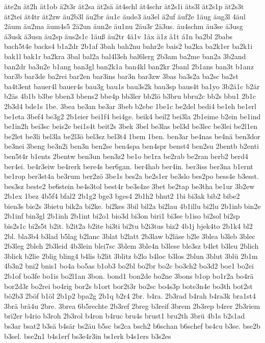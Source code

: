 {äte2n
ät2h
ät1ob
ä2t3r
ät2sa
ät2sä
ät4schl
ät4schr
ät2s1i
äts3l
ät2s1p
ät2s3t
ät2tei
ät4tr
ät2zw
äu2b3l
äu2br
äu1c
äude3
äu3el
ä2uf
äuf2e
1äug
äug3l
4äul
2äum
äu2ma
äum4s5
2ä2un
äun2e
äu1nu
2äu3r
2ä3us.
äu4schm
äu3se
ä3usg
ä3usk
ä3usn
äu2sp
äus2s1c
1äuß
äu2tr
4ä1v
1äx
ä1z
â1t
á1n
ba2bl
2babs
bach5t4e
backs4
b1a2dr
2b1af
3bah
bah2nu
bahr2e
bais2
ba2ka
ba2k1er
ba2k1i
bak1l
bak1r
ba2kra
3bal
bal2a
bal4l3eh
bal6lerg
2b3am
ba2me
ban2a
3b2and
ban2dr
ba3n2e
b1ang
ban3gl
ban2k1a
ban4kl
ban2kr
2banl
2b1ans
ban3t
b1anz
bar3b
bar3de
ba2rei
bar2en
bar3ins
bar3n
bar3zw
3bas
ba3s2a
ba2sc
ba2st
ba4t3ent
bauer4l
bauer4s
bau3g
bau1s
bau3s2k
bau3sp
baus4t
ba1yo
3b2ä1c
b2är
b2äs
4b1b
b3be
bben3
bbens2
bbe4p
bb3ler
bb2lö
b3bru
bbru2c
bb2s
bbu1
2b1c
2b3d4
bde1s
1be.
3bea
be3an
be3ar
3beb
b2ebe
1be1c
be2del
bedi4
be1eh
be1erl
be1eta
3bef4
be3g2
2b1eier
bei1f4
bei4ge.
beik4
beil2
bei3la
2b1eime
b2ein
be1ind
be1in2h
bei3sc
beis2e
bei1s4t
beit2s
3bek
3bel
be3las
bel3d
be3lec
be3lei
be2l1en
be2let
be3li
bel3la
be2l3ö
bel3sz
bel3t4
1bem
1ben.
ben3ar
be4nas
be4nä
ben3dor
be3nei
3beng
be3n2i
ben3n
ben2se
ben4spa
ben4spr
benst4
ben2su
2bentb
b2enti
ben5t4r
b1ents
2bentw
ben3un
ben3z2
be1o
be1ra
be2rab
be2ran
berb2
berd4
ber4ei.
be4r3eiw
be4rerk
bere4s
ber6gan.
ber4hab
ber4in.
ber3iss
ber3na
b1ernt
be1rop
ber3st4a
be3rum
ber2zö
3be1s
bes2a
be2s1er
be3slo
bes2po
bess4e
b3esst.
bes3sz
beste2
be6stein
be4s3tol
best4r
be3s4ze
3bet
be2tap
be3tha
be1ur
3b2ew
2b1ex
1bez
4b5f4
bfal2
2b1g2
bge3
bges4
2b1h2
bhut2
1bi
bi3ak
bib2
bibe2
bien3s
bie2s
3bietu
bik2a
bi2ke.
bi2kes
3bil
bil2a
bi2lau
4b1illu
bi2lu
2b1inb
bin2e
2b1inf
bin3gl
2b1inh
2b1int
bi2o1
bio3d
bi3on
biri1
bi3se
b1iso
bi2sol
bi2sp
bis2s1c
bi2s5t
b2it.
b2it2a
b2ite
bi3ti
bi2tu
b2i3tus
biz2
4b1j
bjek4to
2b1k4
bl2
2bl.
bla3b4
b3lad
b5lag
b2lanc
3blat
b2latt
2b3law
b2läse
b2le
3blea
b3leb
3blec
2b3leg
2bleh
2b3leid
4b3lein
blei7sc
3blem
3ble4n
b3lese
ble3sz
b4let
b3leu
2blich
3blick
b2lie
2blig
bling4
b4lis
b2lit
3blitz
b2lo
b4loc
b3los
2blun
3blut
3blü
2b1m
4b3n2
bni2
bnis1
bo4a
bo5as
b1ob3
bo2bl
bo2br
bo2c
bo3ch2
bo3d2
boe1
bo2ei
2b1of
bo3fe
bo1is
bo2l1an
3bon.
bond1
bon2de
bo2ne
3bons
b1op
bo1r2a
bo4rä
bor2d3r
bo2rei
bo4rig
bor2s
b1ort
bor2t3r
bo2sc
bo4s3p
bote3n4e
bo3th
bot2st
bö2b3
2böf
b1öl
2b1p2
bpa2g
2b1q
b2r4
2br.
b4ra.
2b3rad
b4rah
b4ra3k
bra1st4
3brä
brä4u
2bre.
3brea
6b5rechte
2b3ref
2breg
b3reif
3brem
2b3rep
b4rer
2b3riem
bri2er
b4rio
b3roh
2b3rol
b4ron
b4ruc
bru4s
brust1
bru2th
3brü
4b1s
b2s1ad
bs3ar
bsat2
b3sä
b4sär
bs2äu
b5sc
bs2ca
bsch2
b6schan
b6schef
bs4cu
b3se.
bse2b
b3sel.
bse2n1
b4s1erf
bs3e4r3in
bs1erk
b4s1ers
b3s2es
}
